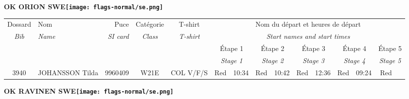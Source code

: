\documentclass{report}
\begin{document}
\newpage
  \Huge \centering \bfseries OK ORION  SWE\normalfont \footnotesize \sffamily \hfill \texttt{[image: flags-normal/se.png]} \newline 
  \begin{longtable}{|c|l|r|c|c|*{5}{cc|}}
    Dossard & Nom  & Puce    & Catégorie & T-shirt & \multicolumn{10}{c|}{Nom du départ et heures de départ} \\
    \itshape Bib     & \itshape Name & \itshape SI card & \itshape Class  & \itshape  T-shirt  & \multicolumn{10}{c|}{\itshape Start names and start times} \\
    \hline
    & & & & & \multicolumn{2}{c|}{Étape 1} & \multicolumn{2}{c|}{Étape 2} & \multicolumn{2}{c|}{Étape 3} & \multicolumn{2}{c|}{Étape 4} & \multicolumn{2}{c|}{Étape 5} \\
    & & & & & \multicolumn{2}{c|}{\itshape Stage 1} & \multicolumn{2}{c|}{\itshape Stage 2} & \multicolumn{2}{c|}{\itshape Stage 3} & \multicolumn{2}{c|}{\itshape Stage 4} & \multicolumn{2}{c|}{\itshape Stage 5} \\
    \hline
    3940 & JOHANSSON Tilda & 9960409 & W21E & COL V/F/S & Red & 10:34 & Red & 10:42 & Red & 12:36 & Red & 09:24 & Red &  \\
  \end{longtable}
\newpage
  \Huge \centering \bfseries OK RAVINEN  SWE\normalfont \footnotesize \sffamily \hfill \texttt{[image: flags-normal/se.png]} \newline 
\end{document}
